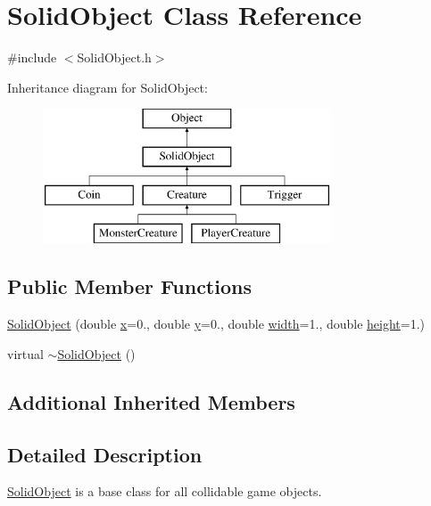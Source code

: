 \hypertarget{class_solid_object}{}\section{Solid\+Object Class Reference}
\label{class_solid_object}


{\ttfamily \#include $<$Solid\+Object.\+h$>$}

Inheritance diagram for Solid\+Object\+:\begin{figure}[H]
\begin{center}
\leavevmode
\includegraphics[height=4.000000cm]{class_solid_object}
\end{center}
\end{figure}
\subsection*{Public Member Functions}
\begin{DoxyCompactItemize}
\item 
\hyperlink{class_solid_object_a259aaf197a5e678e4b593dc3704d3d54}{Solid\+Object} (double \hyperlink{class_object_a02010c1708632be33a760486b1f648f8}{x}=0., double \hyperlink{class_object_a542c4d6094ace575fb4a28f46b9cc6a1}{y}=0., double \hyperlink{class_object_a3afad0ab476968e517b6f48c2a32719f}{width}=1., double \hyperlink{class_object_a811bf2cbf614c4f0a3935a83fb639ffd}{height}=1.)
\item 
virtual \hyperlink{class_solid_object_a78b7c6dec129da027e767eb5d6303f6e}{$\sim$\+Solid\+Object} ()
\end{DoxyCompactItemize}
\subsection*{Additional Inherited Members}


\subsection{Detailed Description}
\hyperlink{class_solid_object}{Solid\+Object} is a base class for all collidable game objects. 

